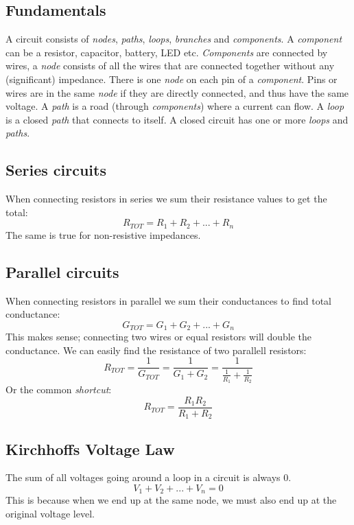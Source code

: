 \subsection{Fundamentals}
A circuit consists of \emph{nodes}, \emph{paths}, \emph{loops}, \emph{branches}
and \emph{components}. A \emph{component} can be a resistor, capacitor, 
battery, LED etc. \emph{Components} are connected by wires, a \emph{node} 
consists of all the wires that are connected together without any (significant) 
impedance. There is one \emph{node} on each pin of a \emph{component}. Pins or 
wires are in the same \emph{node} if they are directly connected, and thus 
have the same voltage. A \emph{path} is a road (through \emph{components}) 
where a current can flow. A \emph{loop} is a closed \emph{path} that connects 
to itself. A closed circuit has one or more \emph{loops} and \emph{paths}.

\subsection{Series circuits}
When connecting resistors in series we sum their resistance values to get the 
total:
\begin{equation}
    R_{TOT} = R_1 + R_2 + ... + R_n
\end{equation}
The same is true for non-resistive impedances.
\subsection{Parallel circuits}
When connecting resistors in parallel we sum their conductances to find total 
conductance:
\begin{equation}
    G_{TOT} = G_1 + G_2 + ... + G_n
\end{equation}
This makes sense; connecting two wires or equal resistors will double the 
conductance. We can easily find the resistance of two parallell resistors:
\begin{equation}
    R_{TOT} = \frac{1}{G_{TOT}} = \frac{1}{G_1 + G_2} = 
    \frac{1}{\frac{1}{R_1} + \frac{1}{R_2}}
\end{equation}
Or the common \emph{shortcut}:
\begin{equation}
    R_{TOT} = \frac{R_1R_2}{R_1+R_2}
\end{equation}
\subsection{Kirchhoffs Voltage Law}
The sum of all voltages going around a loop in a circuit is always 0.
\begin{equation}
    V_1 + V_2 + ... + V_n = 0
\end{equation}
This is because when we end up at the same node, we must also end up at the 
original voltage level.
